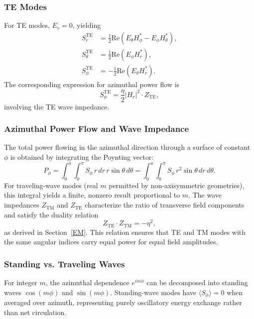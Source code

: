 \documentclass[
  aip,
  amsmath,amssymb,
  preprint
]{revtex4-1}
\begin{document}
\subsubsection{TE Modes}
For TE modes, $E_r = 0$, yielding
\begin{align}
S_r^{\mathrm{TE}} &= \frac{1}{2} \mathrm{Re}\left( E_\theta H_\phi^* - E_\phi H_\theta^* \right), \\
S_\theta^{\mathrm{TE}} &= \frac{1}{2} \mathrm{Re}\left( E_\phi H_r^* \right), \\
S_\phi^{\mathrm{TE}} &= -\frac{1}{2} \mathrm{Re}\left( E_\theta H_r^* \right).
\label{eq:poynting_TE}
\end{align}
The corresponding expression for azimuthal power flow is
\begin{equation}
S_\phi^{\mathrm{TE}} = \frac{\eta}{2} |H_r|^2 \cdot Z_{\mathrm{TE}},
\label{eq:S_phi_TE_explicit}
\end{equation}
involving the TE wave impedance.

\subsubsection{Azimuthal Power Flow and Wave Impedance}
The total power flowing in the azimuthal direction through a surface of constant $\phi$ is obtained by integrating the Poynting vector:
\begin{equation}
P_\phi = \int_0^a \int_0^\pi S_\phi \, r \, dr \, r \sin\theta \, d\theta = \int_0^a \int_0^\pi S_\phi \, r^2 \sin\theta \, dr \, d\theta.
\label{eq:P_phi_integral}
\end{equation}
For traveling-wave modes (real $m$ permitted by non-axisymmetric geometries), this integral yields a finite, nonzero result proportional to $m$.
The wave impedances $Z_{\mathrm{TM}}$ and $Z_{\mathrm{TE}}$ characterize the ratio of transverse field components and satisfy the duality relation
\begin{equation}
Z_{\mathrm{TE}} \cdot Z_{\mathrm{TM}} = -\eta^2,
\label{eq:impedance_duality}
\end{equation}
as derived in Section~\ref{EM}. This relation ensures that TE and TM modes with the same angular indices carry equal power for equal field amplitudes.

\subsubsection{Standing vs. Traveling Waves}
For integer $m$, the azimuthal dependence $e^{im\phi}$ can be decomposed into standing waves $\cos(m\phi)$ and $\sin(m\phi)$. Standing-wave modes have $\langle S_\phi \rangle = 0$ when averaged over azimuth, representing purely oscillatory energy exchange rather than net circulation.
\end{document}
